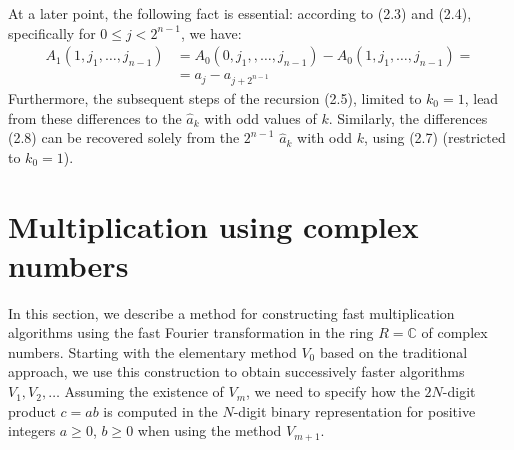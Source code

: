 \documentclass{article}
\begin{document}
At a later point, the following fact is essential: according to (2.3) and (2.4), specifically for $0 \le j < 2^{n - 1}$, we have:
\begin{align*}
\tag{2.8}
A_1(1, j_1, \ldots, j_{n - 1}) &= A_0(0, j_1,, \ldots, j_{n - 1}) - A_0(1, j_1, \ldots, j_{n - 1})  = \\
&= a_j - a_{j + 2^{n - 1}}
\end{align*}
Furthermore, the subsequent steps of the recursion (2.5), limited to $k_0 = 1$, lead from these differences to the $\hat{a}_k$ with odd values of $k$. Similarly, the differences (2.8) can be recovered solely from the $2^{n - 1}$ $\hat{a}_k$ with odd $k$, using (2.7) (restricted to $k_0 = 1$).

\section{Multiplication using complex numbers}
In this section, we describe a method for constructing fast multiplication algorithms using the fast Fourier transformation in the ring $R = \mathbb{C}$ of complex numbers. Starting with the elementary method $V_0$ based on the traditional approach, we use this construction to obtain successively faster algorithms $V_1, V_2, \ldots$ Assuming the existence of $V_m$, we need to specify how the $2N$-digit product $c = a b$ is computed in the $N$-digit binary representation for positive integers $a \ge 0$, $b \ge 0$ when using the method $V_{m+1}$.
\end{document}

